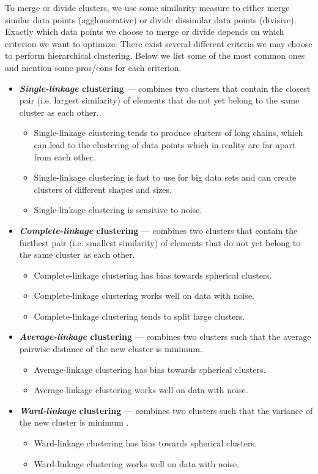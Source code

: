 To merge or divide clusters, we use some similarity measure to either merge similar data points (agglomerative) or divide dissimilar data points (divisive). Exactly which data points we choose to merge or divide depends on which criterion we want to optimize. There exist several different criteria we may choose to perform hierarchical clustering. Below we list some of the most common ones and mention some pros/cons for each criterion.
\begin{itemize}
    \item \textbf{\textit{Single-linkage} clustering} --- combines two clusters that contain the closest pair (i.e. largest similarity) of elements that do not yet belong to the same cluster as each other.
    \begin{itemize}
        \item Single-linkage clustering tends to produce clusters of long chains, which can lead to the clustering of data points which in reality are far apart from each other.
        \item Single-linkage clustering is fast to use for big data sets and can create clusters of different shapes and sizes.
        \item Single-linkage clustering is sensitive to noise.
    \end{itemize}
    \item \textbf{\textit{Complete-linkage} clustering}  --- combines two clusters that contain the furthest pair (i.e. smallest similarity) of elements that do not yet belong to the same cluster as each other.
    \begin{itemize}
        \item Complete-linkage clustering has bias towards spherical clusters.
        \item Complete-linkage clustering works well on data with noise.
        \item Complete-linkage clustering tends to split large clusters.
    \end{itemize}
    \item \textbf{\textit{Average-linkage} clustering} --- combines two clusters such that the average pairwise distance of the new cluster is minimum.
    \begin{itemize}
        \item Average-linkage clustering has bias towards spherical clusters.
        \item Average-linkage clustering works well on data with noise.
    \end{itemize}
    \item \textbf{\textit{Ward-linkage} clustering} --- combines two clusters such that the variance of the new cluster is minimum \cite{Ward1963}.
    \begin{itemize}
        \item Ward-linkage clustering has bias towards spherical clusters.
        \item Ward-linkage clustering works well on data with noise.
    \end{itemize}
\end{itemize}


